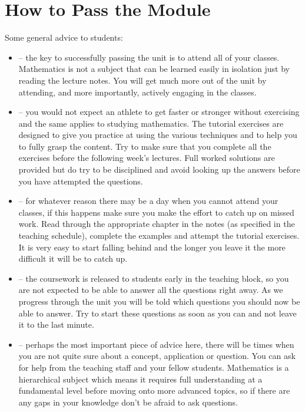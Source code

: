 \documentclass[letterpaper,10pt,english]{jupyterBook}
\begin{document}
\sphinxstepscope


\chapter{How to Pass the Module}
\label{\detokenize{_pages/0.5_How_to_pass:how-to-pass-the-module}}\label{\detokenize{_pages/0.5_How_to_pass::doc}}
\sphinxAtStartPar
Some general advice to students:
\begin{itemize}
\item {} 
\sphinxAtStartPar
{} – the key to successfully passing the unit is to attend all of your classes. Mathematics is not a subject that can be learned easily in isolation just by reading the lecture notes. You will get much more out of the unit by attending, and more importantly, actively engaging in the classes.

\item {} 
\sphinxAtStartPar
{} – you would not expect an athlete to get faster or stronger without exercising and the same applies to studying mathematics. The tutorial exercises are designed to give you practice at using the various techniques and to help you to fully grasp the content. Try to make sure that you complete all the exercises before the following week’s lectures. Full worked solutions are provided but do try to be disciplined and avoid looking up the answers before you have attempted the questions.

\item {} 
\sphinxAtStartPar
{} – for whatever reason there may be a day when you cannot attend your classes, if this happens make sure you make the effort to catch up on missed work. Read through the appropriate chapter in the notes (as specified in the teaching schedule), complete the examples and attempt the tutorial exercises. It is very easy to start falling behind and the longer you leave it the more difficult it will be to catch up.

\item {} 
\sphinxAtStartPar
{} – the coursework is released to students early in the teaching block, so you are not expected to be able to answer all the questions right away. As we progress through the unit you will be told which questions you should now be able to answer. Try to start these questions as soon as you can and not leave it to the last minute.

\item {} 
\sphinxAtStartPar
{} – perhaps the most important piece of advice here, there will be times when you are not quite sure about a concept, application or question. You can ask for help from the teaching staff and your fellow students. Mathematics is a hierarchical subject which means it requires full understanding at a fundamental level before moving onto more advanced topics, so if there are any gaps in your knowledge don’t be afraid to ask questions.

\end{itemize}
\end{document}
